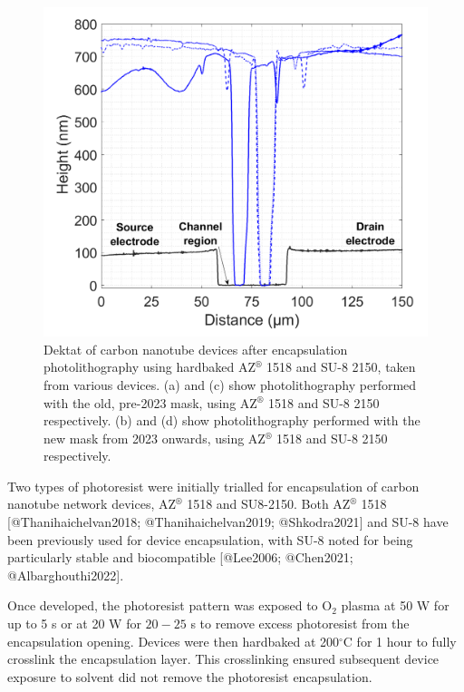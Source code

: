 \documentclass[
  letterpaper,
  DIV=11,
  numbers=noendperiod]{scrartcl}
\begin{document}
\begin{figure}
\begin{minipage}[t]{0.47\linewidth}
{{\includegraphics{figures/ch4/dektat_SU8_oldmask.png}

}

}

\subcaption{\label{fig-SU8-old}}
\end{minipage}%

\caption{\label{fig-dektat-encapsulation}Dektat of carbon nanotube
devices after encapsulation photolithography using hardbaked
AZ\(^\circledR\) 1518 and SU-8 2150, taken from various devices. (a) and
(c) show photolithography performed with the old, pre-2023 mask, using
AZ\(^\circledR\) 1518 and SU-8 2150 respectively. (b) and (d) show
photolithography performed with the new mask from 2023 onwards, using
AZ\(^\circledR\) 1518 and SU-8 2150 respectively.}

\end{figure}

Two types of photoresist were initially trialled for encapsulation of
carbon nanotube network devices, AZ\(^\circledR\) 1518 and SU8-2150.
Both AZ\(^\circledR\) 1518 {[}@Thanihaichelvan2018;
@Thanihaichelvan2019; @Shkodra2021{]} and SU-8 have been previously used
for device encapsulation, with SU-8 noted for being particularly stable
and biocompatible {[}@Lee2006; @Chen2021; @Albarghouthi2022{]}.

Once developed, the photoresist pattern was exposed to O\(_2\) plasma at
50 W for up to 5 s or at 20 W for \(20-25\) s to remove excess
photoresist from the encapsulation opening. Devices were then hardbaked
at 200\(^\circ\)C for 1 hour to fully crosslink the encapsulation layer.
This crosslinking ensured subsequent device exposure to solvent did not
remove the photoresist encapsulation.
\end{document}
